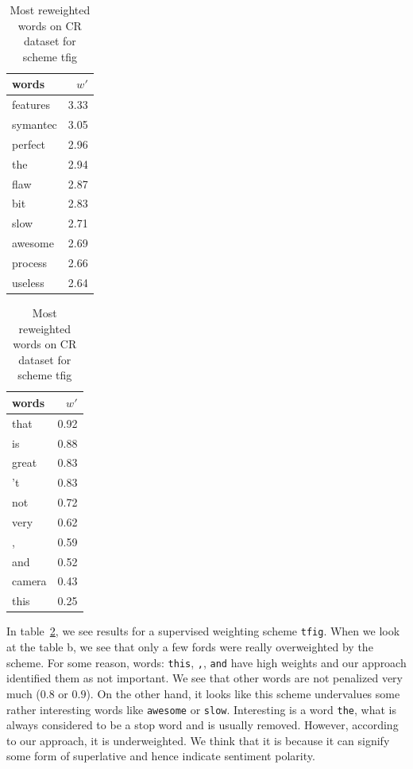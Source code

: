 \begin{table}[H]
    \centering
    \begin{minipage}{.4\linewidth}
      \centering
        \begin{tabular}{lr}
\toprule
    words &  $w'$ \\
\midrule
 features &  3.33 \\
 symantec &  3.05 \\
  perfect &  2.96 \\
      the &  2.94 \\
     flaw &  2.87 \\
      bit &  2.83 \\
     slow &  2.71 \\
  awesome &  2.69 \\
  process &  2.66 \\
  useless &  2.64 \\
\bottomrule
\end{tabular}

    \end{minipage}
    \begin{minipage}{.4\linewidth}
      \centering
        \begin{tabular}{lr}
\toprule
  words &  $w'$ \\
\midrule
   that &  0.92 \\
     is &  0.88 \\
  great &  0.83 \\
     't &  0.83 \\
    not &  0.72 \\
   very &  0.62 \\
      , &  0.59 \\
    and &  0.52 \\
 camera &  0.43 \\
   this &  0.25 \\
\bottomrule
\end{tabular}

    \end{minipage} 
    \caption{Most reweighted words on CR dataset for scheme tfig}
    \label{tab:words:CR:tfig}
\end{table}

    In table~\ref{tab:words:CR:tfig}, we see results for a supervised weighting scheme \texttt{tfig}.
    When we look at the table b, we see that only a few fords were really overweighted by the scheme. 
    For some reason, words: \texttt{this}, \texttt{,}, \texttt{and} have high weights and our approach identified them as not important.
    We see that other words are not penalized very much ($0.8$ or $0.9$).
    On the other hand, it looks like this scheme undervalues some rather interesting words like \texttt{awesome} or \texttt{slow}.
    Interesting is a word \texttt{the}, what is always considered to be a stop word and is usually removed. 
    However, according to our approach, it is underweighted. 
    We think that it is because it can signify some form of superlative and hence indicate sentiment polarity.
    

